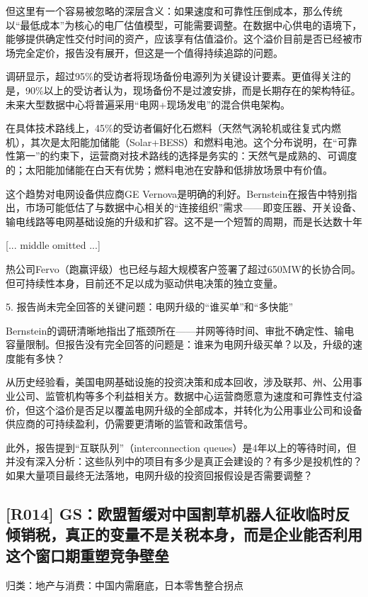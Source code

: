 \documentclass[11pt]{ctexart}
\begin{document}
但这里有一个容易被忽略的深层含义：如果速度和可靠性压倒成本，那么传统以“最低成本”为核心的电厂估值模型，可能需要调整。在数据中心供电的语境下，能够提供确定性交付时间的资产，应该享有估值溢价。这个溢价目前是否已经被市场完全定价，报告没有展开，但这是一个值得持续追踪的问题。

调研显示，超过95\%的受访者将现场备份电源列为关键设计要素。更值得关注的是，90\%以上的受访者认为，现场备份不是过渡安排，而是长期存在的架构特征。未来大型数据中心将普遍采用“电网+现场发电”的混合供电架构。

在具体技术路线上，45\%的受访者偏好化石燃料（天然气涡轮机或往复式内燃机），其次是太阳能加储能（Solar+BESS）和燃料电池。这个分布说明，在“可靠性第一”的约束下，运营商对技术路线的选择是务实的：天然气是成熟的、可调度的；太阳能加储能在白天有优势；燃料电池在安静和低排放场景中有价值。

这个趋势对电网设备供应商GE Vernova是明确的利好。Bernstein在报告中特别指出，市场可能低估了与数据中心相关的“连接组织”需求——即变压器、开关设备、输电线路等电网基础设施的升级和扩容。这不是一个短暂的周期，而是长达数十年

[... middle omitted ...]

热公司Fervo（跑赢评级）也已经与超大规模客户签署了超过650MW的长协合同。但可持续性本身，目前还不足以成为驱动供电决策的独立变量。

5. 报告尚未完全回答的关键问题：电网升级的“谁买单”和“多快能”

Bernstein的调研清晰地指出了瓶颈所在——并网等待时间、审批不确定性、输电容量限制。但报告没有完全回答的问题是：谁来为电网升级买单？以及，升级的速度能有多快？

从历史经验看，美国电网基础设施的投资决策和成本回收，涉及联邦、州、公用事业公司、监管机构等多个利益相关方。数据中心运营商愿意为速度和可靠性支付溢价，但这个溢价是否足以覆盖电网升级的全部成本，并转化为公用事业公司和设备供应商的可持续盈利，仍需要更清晰的监管和政策信号。

此外，报告提到“互联队列”（interconnection queues）是4年以上的等待时间，但并没有深入分析：这些队列中的项目有多少是真正会建设的？有多少是投机性的？如果大量项目最终无法落地，电网升级的投资回报假设是否需要调整？

\subsection{[R014] GS：欧盟暂缓对中国割草机器人征收临时反倾销税，真正的变量不是关税本身，而是企业能否利用这个窗口期重塑竞争壁垒}
{\small\color{refgray}归类：地产与消费：中国内需磨底，日本零售整合拐点}
\end{document}
